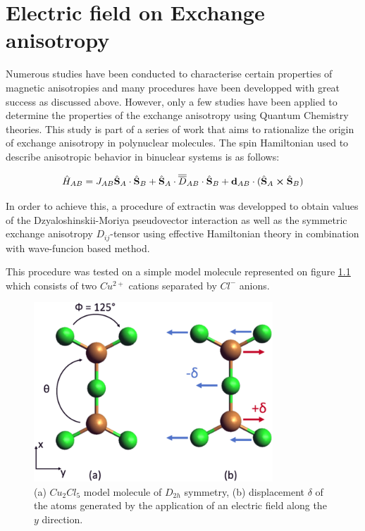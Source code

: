 \documentclass[10pt]{report}
\numberwithin{equation}{section}
\begin{document}
\chapter{Electric field on Exchange anisotropy}\label{chap:Cu2Cl5}

Numerous studies have been conducted to characterise certain properties of magnetic anisotropies and many procedures have been developped with great success as discussed above. 
However, only a few studies have been applied to determine the properties of the exchange anisotropy using Quantum Chemistry theories.
This study is part of a series of work that aims to rationalize the origin of exchange anisotropy in polynuclear molecules.
The spin Hamiltonian used to describe anisotropic behavior in binuclear systems is as follows:

\begin{equation}
    \hat{H}_{AB}=J_{AB}\hat{\vb S}_A \cdot \hat{\vb S}_B + \hat{\vb S}_A \cdot\overline{\overline{D}}_{AB} \cdot \hat{\vb S}_B + \vb{d}_{AB} \cdot (\hat{\vb S}_A \cross \hat{\vb S}_B)
\end{equation}

In order to achieve this, a procedure of extractin was developped to obtain values of the Dzyaloshinskii-Moriya pseudovector interaction as well as the symmetric exchange anisotropy $D_{ij}$-tensor using effective Hamiltonian theory in combination with wave-funcion based method.

This procedure was tested on a simple model molecule represented on figure \ref{MolCu2Cl5} which consists of two $Cu^{2+}$ cations separated by $Cl^-$ anions.
\begin{figure}[h!]
    \centering
    \includegraphics[width=0.8\textwidth]{Images/Cu2Cl5.png}
    \caption{(a) $Cu_2Cl_5$ model molecule of $D_{2h}$ symmetry, (b) displacement $\delta$ of the atoms generated by the application of an electric field along the $y$ direction.}
    \label{MolCu2Cl5}
\end{figure}
\end{document}
